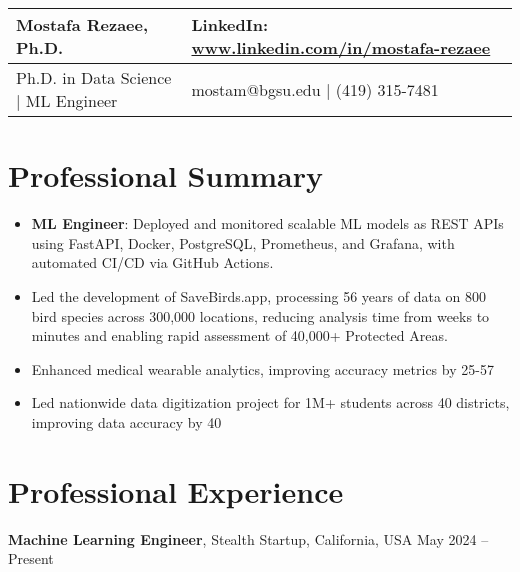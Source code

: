 \documentclass[a4paper,10pt]{article}
\begin{document}
\noindent

\begin{tabular}{@{}p{3.5in} p{3.5in}@{}}

    {\bfseries\LARGE Mostafa Rezaee, Ph.D.} & \hfill LinkedIn: \href{https://www.linkedin.com/in/mostafa-rezaee/}{www.linkedin.com/in/mostafa-rezaee} \\
    
    \hline 
    
    Ph.D. in Data Science | ML Engineer & \hfill mostam@bgsu.edu | (419) 315-7481
\end{tabular}

\section*{Professional Summary}

\begin{itemize}
    \item \textbf{ML Engineer}: Deployed and monitored scalable ML models as REST APIs using FastAPI, Docker, PostgreSQL, Prometheus, and Grafana, with automated CI/CD via GitHub Actions.
    
    \item Led the development of SaveBirds.app, processing 56 years of data on 800 bird species across 300,000 locations, reducing analysis time from weeks to minutes and enabling rapid assessment of 40,000+ Protected Areas.
    
    \item Enhanced medical wearable analytics, improving accuracy metrics by 25-57%
    
    \item Led nationwide data digitization project for 1M+ students across 40 districts, improving data accuracy by 40%
\end{itemize}

\section*{Professional Experience}

\vspace{4pt}
{\bfseries Machine Learning Engineer}, Stealth Startup, California, USA \hfill May 2024 -- Present
\end{document}
